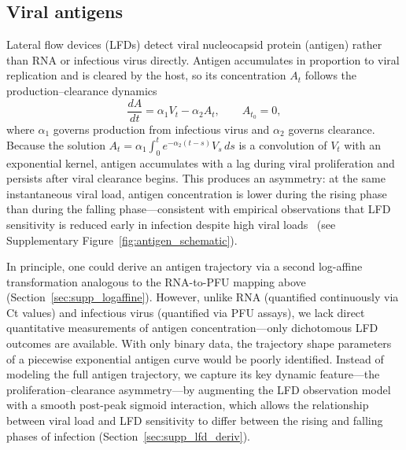 \documentclass[12pt]{article}
\begin{document}
\subsection{Viral antigens}
\label{sec:antigens}
Lateral flow devices (LFDs) detect viral nucleocapsid protein (antigen) rather than RNA or infectious virus directly. Antigen accumulates in proportion to viral replication and is cleared by the host, so its concentration $A_t$ follows the production--clearance dynamics
\begin{equation*}
    \frac{dA}{dt} = \alpha_1 V_t - \alpha_2 A_t, \qquad A_{t_0} = 0,
\end{equation*}
where $\alpha_1$ governs production from infectious virus and $\alpha_2$ governs clearance. Because the solution $A_t = \alpha_1 \int_0^t e^{-\alpha_2(t-s)} V_s\,ds$ is a convolution of $V_t$ with an exponential kernel, antigen accumulates with a lag during viral proliferation and persists after viral clearance begins. This produces an asymmetry: at the same instantaneous viral load, antigen concentration is lower during the rising phase than during the falling phase---consistent with empirical observations that LFD sensitivity is reduced early in infection despite high viral loads~\cite{hakki2022onset} (see Supplementary Figure~\ref{fig:antigen_schematic}).

In principle, one could derive an antigen trajectory via a second log-affine transformation analogous to the RNA-to-PFU mapping above (Section~\ref{sec:supp_logaffine}). However, unlike RNA (quantified continuously via Ct values) and infectious virus (quantified via PFU assays), we lack direct quantitative measurements of antigen concentration---only dichotomous LFD outcomes are available. With only binary data, the trajectory shape parameters of a piecewise exponential antigen curve would be poorly identified. Instead of modeling the full antigen trajectory, we capture its key dynamic feature---the proliferation--clearance asymmetry---by augmenting the LFD observation model with a smooth post-peak sigmoid interaction, which allows the relationship between viral load and LFD sensitivity to differ between the rising and falling phases of infection (Section~\ref{sec:supp_lfd_deriv}).
\end{document}
